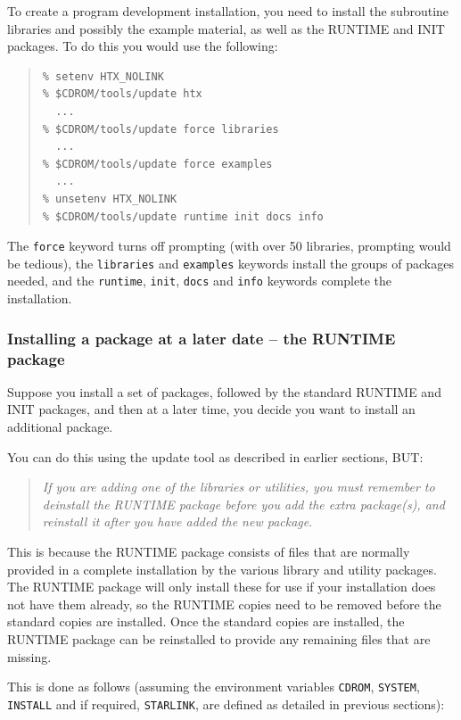 \documentclass[twoside,11pt]{article}
\renewcommand{\_}{\texttt{\symbol{95}}}
\begin{document}
To create a program development installation, you need to install the
subroutine libraries and possibly the example material, as well as the 
RUNTIME and INIT packages.  To do this you would use the following:

\begin{quote}
\begin{verbatim}
% setenv HTX_NOLINK
% $CDROM/tools/update htx 
  ...
% $CDROM/tools/update force libraries 
  ...
% $CDROM/tools/update force examples 
  ...
% unsetenv HTX_NOLINK
% $CDROM/tools/update runtime init docs info
\end{verbatim}
\end{quote}

The \texttt{force} keyword turns off prompting (with over 50 libraries,
prompting would be tedious), the \texttt{libraries} and \texttt{examples}
keywords install the groups of packages needed, and the \texttt{runtime},
\texttt{init}, \texttt{docs} and \texttt{info} keywords complete the
installation.

\subsubsection{Installing a package at a later date -- the RUNTIME
package}

Suppose you install a set of packages, followed by the standard RUNTIME
and INIT packages, and then at a later time, you decide you want to
install an additional package.

You can do this using the update tool as described in earlier sections,
BUT:

\begin{quote}
\emph{If you are adding one of the libraries or utilities, you must
remember to deinstall the RUNTIME package before you add the extra 
package(s), and reinstall it after you have added the new package}.
\end{quote}

This is because the RUNTIME package consists of files that are normally
provided in a complete installation by the various library and utility 
packages.  The
RUNTIME package will only install these for use if your installation
does not have them already, so the RUNTIME copies need to be removed
before the standard copies are installed.  Once the standard copies are
installed, the RUNTIME package can be reinstalled to provide any remaining
files that are missing.

This is done as follows (assuming the environment variables
\texttt{CDROM}, \texttt{SYSTEM}, \texttt{INSTALL} and if required,
\texttt{STARLINK}, are defined as detailed in previous sections):
\end{document}
